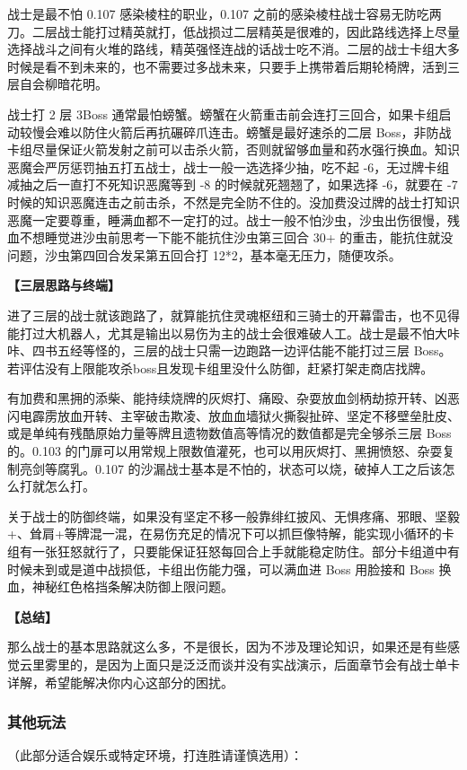 ﻿\documentclass[12pt, a4paper]{article}
\begin{document}
战士是最不怕 0.107 感染棱柱的职业，0.107 之前的感染棱柱战士容易无防吃两刀。二层战士能打过精英就打，低战损过二层精英是很难的，因此路线选择上尽量选择战斗之间有火堆的路线，精英强怪连战的话战士吃不消。二层的战士卡组大多时候是看不到未来的，也不需要过多战未来，只要手上携带着后期轮椅牌，活到三层自会柳暗花明。

战士打 2 层 3Boss 通常最怕螃蟹。螃蟹在火箭重击前会连打三回合，如果卡组启动较慢会难以防住火箭后再抗碾碎爪连击。螃蟹是最好速杀的二层 Boss，非防战卡组尽量保证火箭发射之前可以击杀火箭，否则就留够血量和药水强行换血。知识恶魔会严厉惩罚抽五打五战士，战士一般一选选择少抽，吃不起 -6，无过牌卡组减抽之后一直打不死知识恶魔等到 -8 的时候就死翘翘了，如果选择 -6，就要在 -7 时候的知识恶魔连击之前击杀，不然是完全防不住的。没加费没过牌的战士打知识恶魔一定要尊重，睡满血都不一定打的过。战士一般不怕沙虫，沙虫出伤很慢，残血不想睡觉进沙虫前思考一下能不能抗住沙虫第三回合 30+ 的重击，能抗住就没问题，沙虫第四回合发呆第五回合打 12*2，基本毫无压力，随便攻杀。

\textbf{【三层思路与终端】}

进了三层的战士就该跑路了，就算能抗住灵魂枢纽和三骑士的开幕雷击，也不见得能打过大机器人，尤其是输出以易伤为主的战士会很难破人工。战士是最不怕大咔咔、四书五经等怪的，三层的战士只需一边跑路一边评估能不能打过三层 Boss。若评估没有上限能攻杀boss且发现卡组里没什么防御，赶紧打架走商店找牌。

有加费和黑拥的添柴、能持续烧牌的灰烬打、痛殴、杂耍放血剑柄劫掠开转、凶恶闪电霹雳放血开转、主宰破击欺凌、放血血墙狱火撕裂扯碎、坚定不移壁垒肚皮、或是单纯有残酷原始力量等牌且遗物数值高等情况的数值都是完全够杀三层 Boss 的。0.103 的门扉可以用常规上限数值灌死，也可以用灰烬打、黑拥愤怒、杂耍复制亮剑等腐乳。0.107 的沙漏战士基本是不怕的，状态可以烧，破掉人工之后该怎么打就怎么打。

关于战士的防御终端，如果没有坚定不移一般靠绯红披风、无惧疼痛、邪眼、坚毅+、耸肩+等牌混一混，在易伤充足的情况下可以抓巨像特解，能实现小循环的卡组有一张狂怒就行了，只要能保证狂怒每回合上手就能稳定防住。部分卡组道中有时候未到或是道中战损低，卡组出伤能力强，可以满血进 Boss 用脸接和 Boss 换血，神秘红色格挡条解决防御上限问题。

\textbf{【总结】}

那么战士的基本思路就这么多，不是很长，因为不涉及理论知识，如果还是有些感觉云里雾里的，是因为上面只是泛泛而谈并没有实战演示，后面章节会有战士单卡详解，希望能解决你内心这部分的困扰。

\subsubsection{其他玩法}
（此部分适合娱乐或特定环境，打连胜请谨慎选用）：
\end{document}
